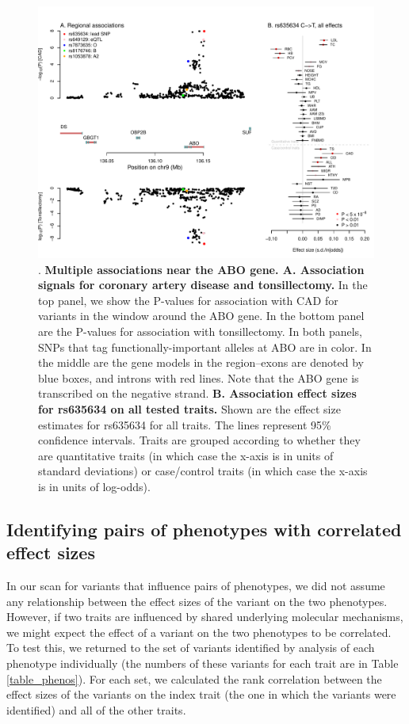 \documentclass[11pt,titlepage]{article}
\begin{document}
\begin{figure}
\begin{center}
\includegraphics[scale = 0.7]{figs/CAD_TS_ABOregion.pdf}
\caption{. \textbf{Multiple associations near the ABO gene. A. Association signals for coronary artery disease and tonsillectomy.} In the top panel, we show the P-values for association with CAD for variants in the window around the ABO gene. In the bottom panel are the P-values for association with tonsillectomy. In both panels, SNPs that tag functionally-important alleles at ABO are in color. In the middle are the gene models in the region--exons are denoted by blue boxes, and introns with red lines. Note that the ABO gene is transcribed on the negative strand. \textbf{B. Association effect sizes for rs635634 on all tested traits.} Shown are the effect size estimates for rs635634 for all traits. The lines represent 95\% confidence intervals. Traits are grouped according to whether they are quantitative traits (in which case the x-axis is in units of standard deviations) or case/control traits (in which case the x-axis is in units of log-odds). }\label{f_eg}
\end{center}
\end{figure}

\subsection{Identifying pairs of phenotypes with correlated effect sizes}
In our scan for variants that influence pairs of phenotypes, we did not assume any relationship between the effect sizes of the variant on the two phenotypes. 
However, if two traits are influenced by shared underlying molecular mechanisms, we might expect the effect of a variant on the two phenotypes to be correlated. 
To test this, we returned to the set of variants identified by analysis of each phenotype individually (the numbers of these variants for each trait are in Table \ref{table_phenos}).
For each set, we calculated the rank correlation between the effect sizes of the variants on the index trait (the one in which the variants were identified) and all of the other traits. 
\end{document}
